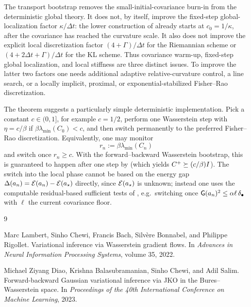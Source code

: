 \begin{remark}
\label{rem:transport-bootstrap-caveat}
The transport bootstrap removes the small-initial-covariance burn-in from the deterministic
global theory. It does not, by itself, improve the fixed-step global-localization factor
$\kappa/\Delta t$: the lower construction of  already starts at
$c_0=1/\kappa$, after the covariance has reached the curvature scale. It also does not improve the
explicit local discretization factor $(4+\Gamma)/\Delta t$ for the Riemannian scheme or
$(4+2\Delta t+\Gamma)/\Delta t$ for the KL scheme. Thus covariance warm-up, fixed-step global
localization, and local stiffness are three distinct issues. To improve the latter two factors one
needs additional adaptive relative-curvature control, a line search, or a locally implicit,
proximal, or exponential-stabilized Fisher--Rao discretization.
\end{remark}

\begin{remark}
The theorem suggests a particularly simple deterministic implementation. Pick a constant
$c\in(0,1]$, for example $c=1/2$, perform one Wasserstein step with
$\eta=c/\beta$ if $\beta\lambda_{\min}(C_0)<c$, and then switch permanently to the preferred
Fisher--Rao discretization. Equivalently, one may monitor
\[
    r_n:=\beta\lambda_{\min}(C_n)
\]
and switch once $r_n\ge c$. With the forward--backward Wasserstein bootstrap, this is
guaranteed to happen after one step by  (which yields
$C^+\succeq(c/\beta)I$). The switch into the local
phase cannot be based on the energy gap $\Delta(a_n)=\mathcal{E}(a_n)-\mathcal{E}(a_\star)$ directly,
since $\mathcal{E}(a_\star)$ is unknown; instead one uses the computable residual-based
sufficient tests of , e.g.\ switching once
$\mathsf{G}(a_n)^2\le\alpha\ell\,\delta_\bullet$ with $\ell$ the current covariance floor.
\end{remark}

\begin{thebibliography}{9}

Marc Lambert, Sinho Chewi, Francis Bach, Silv\`ere Bonnabel, and Philippe Rigollet.
\newblock Variational inference via Wasserstein gradient flows.
\newblock In \emph{Advances in Neural Information Processing Systems}, volume 35, 2022.

Michael Ziyang Diao, Krishna Balasubramanian, Sinho Chewi, and Adil Salim.
\newblock Forward-backward Gaussian variational inference via JKO in the Bures--Wasserstein space.
\newblock In \emph{Proceedings of the 40th International Conference on Machine Learning}, 2023.

\end{thebibliography}


